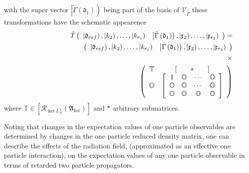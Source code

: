 \documentclass[aps,preprint]{revtex4}
\begin{document}
with the super vector $\left\vert \tilde{\Gamma}\left( \mathfrak{d}%
_{1}\right) \right) $ being part of the basis of $\mathcal{V}_{\tilde{\Gamma}%
}$ these transformations have the schematic appearence%
\begin{eqnarray}
&&\hat{T}\left( 
\begin{array}{cc}
\left\vert \mathfrak{d}_{ref}\right) ,\left\vert k_{2}\right) ,\ldots
,\left\vert k_{r_{1}}\right) & \left\vert \tilde{\Gamma}\left( \mathfrak{d}%
_{1}\right) \right) \mathfrak{,}\left\vert \mathfrak{x}_{2}\right) ,\ldots
,\left\vert \mathfrak{x}_{r_{2}}\right)%
\end{array}%
\right) =  \notag \\
&&\qquad \qquad \left( 
\begin{array}{cc}
\left\vert \mathfrak{d}_{ref}\right) ,\left\vert k_{2}\right) ,\ldots
,\left\vert k_{r_{1}}\right) & \left\vert \tilde{\Gamma}\left( \mathfrak{d}%
_{1}\right) \right) \mathfrak{,}\left\vert \mathfrak{x}_{2}\right) ,\ldots
,\left\vert \mathfrak{x}_{r_{2}}\right)%
\end{array}%
\right)  \notag \\
&&\times \\
&&\qquad \qquad \qquad \qquad \qquad \qquad \qquad \qquad \left( 
\begin{array}{cc}
\mathbb{T} & \left[ \qquad \ast \qquad \right] \\ 
\mathbb{O} & \left[ 
\begin{array}{cccc}
1 & \mathbb{O} & \mathbf{\cdots } & \mathbb{O} \\ 
\mathbb{O} & \mathbb{O} & \cdots & \mathbb{O} \\ 
\mathbb{O} & \mathbb{O} & \mathbb{O} & \mathbb{O}%
\end{array}%
\right]%
\end{array}%
\right)
\end{eqnarray}%
where $\mathbb{T\in }\left[ \mathcal{R}_{\ker L_{N}^{1}}\left( \mathfrak{A}%
_{\ker }\right) \right] $ and $\ast $ arbitrary submatrices.

Noting that changes in the expectation values of one particle observables
are determined by changes in the one particle reduced density matrix, one
can describe the effects of the radiation field, (approximated as an
effective one particle interaction), on the expectation values of any one
particle observable in terms of retarded two particle propagators.

\bigskip
\end{document}
